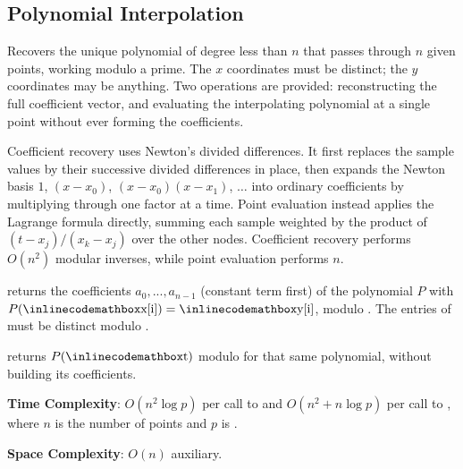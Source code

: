 \subsection{Polynomial Interpolation}
\label{sec:6.6.4}
Recovers the unique polynomial of degree less than $n$ that passes through $n$ given points, working modulo a prime. The $x$ coordinates must be distinct; the $y$ coordinates may be anything. Two operations are provided: reconstructing the full coefficient vector, and evaluating the interpolating polynomial at a single point without ever forming the coefficients.

Coefficient recovery uses Newton's divided differences. It first replaces the sample values by their successive divided differences in place, then expands the Newton basis $1$, $(x - x_0)$, $(x - x_0)(x - x_1)$, $\ldots$ into ordinary coefficients by multiplying through one factor at a time. Point evaluation instead applies the Lagrange formula directly, summing each sample weighted by the product of $(t - x_j) / (x_k - x_j)$ over the other nodes. Coefficient recovery performs $O(n^{2})$ modular inverses, while point evaluation performs $n$.

\begin{compactitem}
  \item {} returns the coefficients $a_0, ..., a_{n-1}$ (constant term first) of the polynomial $P$ with $P({\inlinecodemath{x[i]}}) = {\inlinecodemath{y[i]}}$, modulo . The entries of  must be distinct modulo .
  \item {} returns $P({\inlinecodemath{t}})$ modulo  for that same polynomial, without building its coefficients.
\end{compactitem}

\textbf{Time Complexity}: $O(n^{2} \log p)$ per call to  and $O(n^{2} + n \log p)$ per call to , where $n$ is the number of points and $p$ is .

\textbf{Space Complexity}: $O(n)$ auxiliary.

